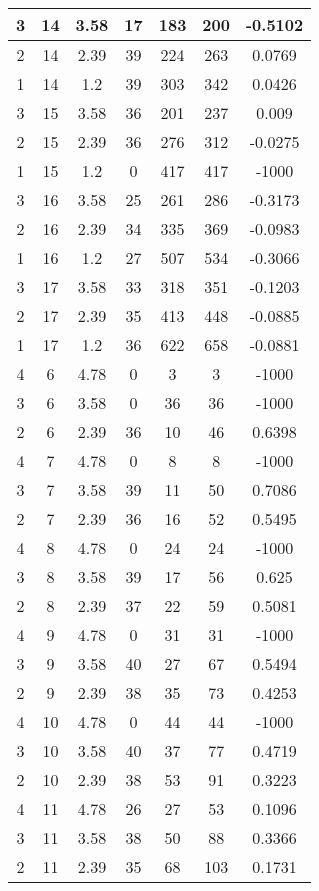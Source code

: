 \documentclass[letterpaper, 12pt]{article}
\begin{document}
\begin{longtable}{|c|c|c|c|c|c|c|}
\hline
3 & 14 & 3.58 & 17 & 183 & 200 & -0.5102 \\
\hline
2 & 14 & 2.39 & 39 & 224 & 263 & 0.0769 \\
\hline
1 & 14 & 1.2 & 39 & 303 & 342 & 0.0426 \\
\hline
3 & 15 & 3.58 & 36 & 201 & 237 & 0.009 \\
\hline
2 & 15 & 2.39 & 36 & 276 & 312 & -0.0275 \\
\hline
1 & 15 & 1.2 & 0 & 417 & 417 & -1000 \\
\hline
3 & 16 & 3.58 & 25 & 261 & 286 & -0.3173 \\
\hline
2 & 16 & 2.39 & 34 & 335 & 369 & -0.0983 \\
\hline
1 & 16 & 1.2 & 27 & 507 & 534 & -0.3066 \\
\hline
3 & 17 & 3.58 & 33 & 318 & 351 & -0.1203 \\
\hline
2 & 17 & 2.39 & 35 & 413 & 448 & -0.0885 \\
\hline
1 & 17 & 1.2 & 36 & 622 & 658 & -0.0881 \\
\hline
4 & 6 & 4.78 & 0 & 3 & 3 & -1000 \\
\hline
3 & 6 & 3.58 & 0 & 36 & 36 & -1000 \\
\hline
2 & 6 & 2.39 & 36 & 10 & 46 & 0.6398 \\
\hline
4 & 7 & 4.78 & 0 & 8 & 8 & -1000 \\
\hline
3 & 7 & 3.58 & 39 & 11 & 50 & 0.7086 \\
\hline
2 & 7 & 2.39 & 36 & 16 & 52 & 0.5495 \\
\hline
4 & 8 & 4.78 & 0 & 24 & 24 & -1000 \\
\hline
3 & 8 & 3.58 & 39 & 17 & 56 & 0.625 \\
\hline
2 & 8 & 2.39 & 37 & 22 & 59 & 0.5081 \\
\hline
4 & 9 & 4.78 & 0 & 31 & 31 & -1000 \\
\hline
3 & 9 & 3.58 & 40 & 27 & 67 & 0.5494 \\
\hline
2 & 9 & 2.39 & 38 & 35 & 73 & 0.4253 \\
\hline
4 & 10 & 4.78 & 0 & 44 & 44 & -1000 \\
\hline
3 & 10 & 3.58 & 40 & 37 & 77 & 0.4719 \\
\hline
2 & 10 & 2.39 & 38 & 53 & 91 & 0.3223 \\
\hline
4 & 11 & 4.78 & 26 & 27 & 53 & 0.1096 \\
\hline
3 & 11 & 3.58 & 38 & 50 & 88 & 0.3366 \\
\hline
2 & 11 & 2.39 & 35 & 68 & 103 & 0.1731 \\

\end{longtable}
\end{document}
